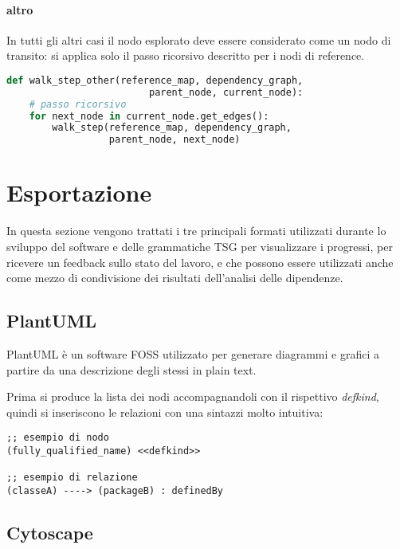 \paragraph{altro}

In tutti gli altri casi il nodo esplorato deve essere considerato come un nodo di transito: si applica solo il passo ricorsivo descritto per i nodi di reference.

\begin{lstlisting}[language=Python, caption=pseudocodice]
def walk_step_other(reference_map, dependency_graph,
                         parent_node, current_node):
    # passo ricorsivo
    for next_node in current_node.get_edges():
        walk_step(reference_map, dependency_graph,
                  parent_node, next_node)
\end{lstlisting}

\section{Esportazione}

In questa sezione vengono trattati i tre principali formati utilizzati durante lo sviluppo del software e delle grammatiche TSG per visualizzare i progressi, per ricevere un feedback sullo stato del lavoro, e che possono essere utilizzati anche come mezzo di condivisione dei risultati dell'analisi delle dipendenze.

\subsection{PlantUML}

PlantUML \cite{PlantUML} \`e un software FOSS utilizzato per generare diagrammi e grafici a partire da una descrizione degli stessi in plain text.

Prima si produce la lista dei nodi accompagnandoli con il rispettivo \emph{defkind}, quindi si inseriscono le relazioni con una sintazzi molto intuitiva:

\begin{lstlisting}
;; esempio di nodo
(fully_qualified_name) <<defkind>>

;; esempio di relazione
(classeA) ----> (packageB) : definedBy
\end{lstlisting}

\subsection{Cytoscape}

